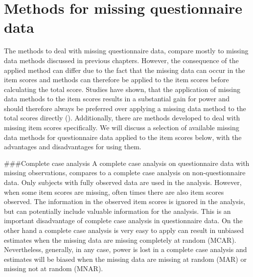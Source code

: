 \documentclass[
]{book}
\begin{document}
\hypertarget{methods-for-missing-questionnaire-data}{%
\section{Methods for missing questionnaire data}\label{methods-for-missing-questionnaire-data}}

The methods to deal with missing questionnaire data, compare mostly to missing data methods discussed in previous chapters. However, the consequence of the applied method can differ due to the fact that the missing data can occur in the item scores and methods can therefore be applied to the item scores before calculating the total score. Studies have shown, that the application of missing data methods to the item scores results in a substantial gain for power and should therefore always be preferred over applying a missing data method to the total scores directly (\citet{Eekhout2014}). Additionally, there are methods developed to deal with missing item scores specifically. We will discuss a selection of available missing data methods for questionnaire data applied to the item scores below, with the advantages and disadvantages for using them.

\#\#\#Complete case analysis
A complete case analysis on questionnaire data with missing observations, compares to a complete case analysis on non-questionnaire data. Only subjects with fully observed data are used in the analysis. However, when some item scores are missing, often times there are also item scores observed. The information in the observed item scores is ignored in the analysis, but can potentially include valuable information for the analysis. This is an important disadvantage of complete case analysis in questionnaire data. On the other hand a complete case analysis is very easy to apply can result in unbiased estimates when the missing data are missing completely at random (MCAR). Nevertheless, generally, in any case, power is lost in a complete case analysis and estimates will be biased when the missing data are missing at random (MAR) or missing not at random (MNAR).
\end{document}

